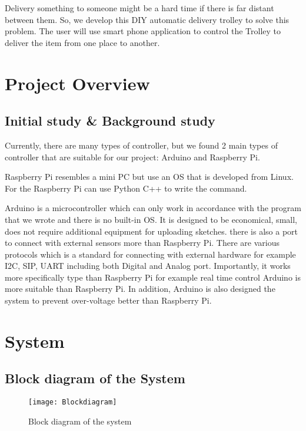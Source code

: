 \documentclass[12pt]{article}
\begin{document}
Delivery something to someone might be a hard time if there is far distant between them. So, we develop this DIY automatic delivery trolley to solve this problem. The user will use smart phone application to control the Trolley to deliver the item from one place to another.

\section{Project Overview} \label{sec:project over}

\subsection{Initial study \& Background study} \label{subsec:initial study}

Currently, there are many types of controller, but we found 2 main types of controller that are suitable for our project: Arduino and Raspberry Pi. \par
Raspberry Pi resembles a mini PC but use an OS that is developed from Linux. For the Raspberry Pi can use Python C++ to write the command. \par
Arduino is a microcontroller which can only work in accordance with the program that we wrote and there is no built-in OS. It is designed to be economical, small, does not require additional equipment for uploading sketches. there is also a port to connect with external sensors more than Raspberry Pi. There are various protocols which is a standard for connecting with external hardware for example I2C, SIP, UART including both Digital and Analog port. Importantly, it works more specifically type than Raspberry Pi for example real time control Arduino is more suitable than Raspberry Pi. In addition, Arduino is also designed the system to prevent over-voltage better than Raspberry Pi.

\section{System} \label{sec:system}

\subsection{Block diagram of the System} \label{subsec:block diagram}

\begin{figure}[H]
	\centering
	\texttt{[image: Blockdiagram]}
	\vspace{0.1cm}
	\caption{Block diagram of the system} \label{fig:block}	
\end{figure}
\end{document}
